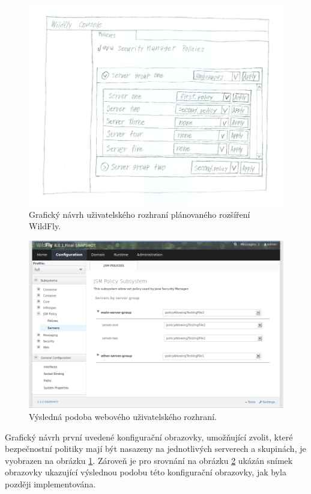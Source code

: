 \begin{figure}[ht]
  \centering
  \includegraphics[width=14cm]{fig/mockup}
  \caption{Grafický návrh uživatelského rozhraní plánovaného rozšíření WildFly.}
  \label{navrhGui}
\end{figure}

\begin{figure}[ht]
  \centering
  \includegraphics[width=14cm]{fig/jsmpolicy-servers}
  \caption{Výsledná podoba webového uživatelského rozhraní.}
  \label{vysledneGui}
\end{figure}

Grafický návrh první uvedené konfigurační obrazovky, umožňující zvolit, které bezpečnostní politiky mají být nasazeny na jednotlivých serverech a skupinách, je vyobrazen na obrázku \ref{navrhGui}. Zároveň je pro srovnání na obrázku \ref{vysledneGui} ukázán snímek obrazovky ukazující výslednou podobu této konfigurační obrazovky, jak byla později implementována.

